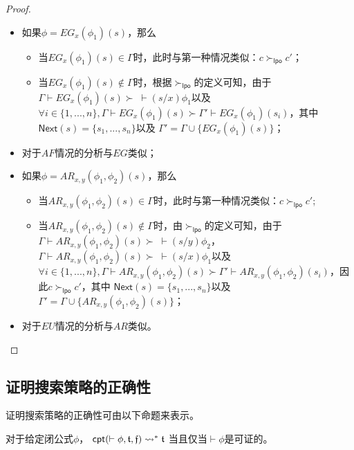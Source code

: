 \begin{proof}
\begin{itemize}
		\item 如果$\phi = EG_x(\phi_1)(s)$，那么
		\begin{itemize}
			\item 当$EG_x(\phi_1)(s)\in \Gamma$时，此时与第一种情况类似：$c\succ_{\mathsf{lpo}}c'$；
			\item 当$EG_x(\phi_1)(s)\not\in \Gamma$时，根据$\succ_{\mathsf{lpo}}$的定义可知，由于$\Gamma\vdash EG_x(\phi_1)(s) \succ \;\vdash(s/x)\phi_1$以及$\forall i\in\{1,...,n\}, \Gamma\vdash EG_x(\phi_1)(s) \succ \Gamma'\vdash EG_x(\phi_1)(s_i)$，其中$\textsf{Next}(s)=\{s_1,...,s_n\}$以及 $\Gamma'=\Gamma\cup\{EG_x(\phi_1)(s)\}$；
		\end{itemize}
		\item 对于$AF$情况的分析与$EG$类似；
		\item 如果$\phi = AR_{x,y}(\phi_1,\phi_2)(s)$，那么
		\begin{itemize}
			\item 当$AR_{x,y}(\phi_1,\phi_2)(s) \in \Gamma$时，此时与第一种情况类似：$c\succ_{\mathsf{lpo}}c'$;
			\item 当$AR_{x,y}(\phi_1,\phi_2)(s) \notin \Gamma$时，由$\succ_{\mathsf{lpo}}$的定义可知，由于$\Gamma\vdash AR_{x,y}(\phi_1,\phi_2)(s) \succ \;\vdash (s/y)\phi_2$， $\Gamma\vdash AR_{x,y}(\phi_1,\phi_2)(s) \succ \;\vdash (s/x)\phi_1$以及$\forall i\in\{1,...,n\}, \Gamma\vdash AR_{x,y}(\phi_1,\phi_2)(s) \succ \Gamma'\vdash AR_{x,y}(\phi_1,\phi_2)(s_i)$，因此$c\succ_{\mathsf{lpo}} c'$，其中 $\textsf{Next}(s)=\{s_1,...,s_n\}$以及 $\Gamma'=\Gamma\cup\{AR_{x,y}(\phi_1,\phi_2)(s)\}$；
		\end{itemize}
		\item 对于$EU$情况的分析与$AR$类似。
	\end{itemize}
\end{proof}


\subsection{证明搜索策略的正确性}\label{subsec:cpt:correctness}
证明搜索策略的正确性可由以下命题来表示。
\begin{proposition}[证明搜索策略的正确性]
	对于给定闭公式$\phi$， 
	$\textsf{cpt}(\vdash\phi, \mathfrak{t}, \mathfrak{f}) \rightsquigarrow^* \mathfrak{t}$ 当且仅当$\vdash \phi$是可证的。
\end{proposition}

